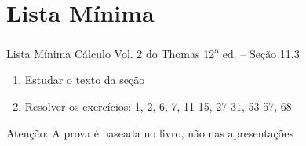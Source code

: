 \section{Lista Mínima}

\begin{frame}{Lista Mínima}
  Cálculo Vol. 2 do Thomas 12\textsuperscript{a} ed. -- Seção 11.3
  \begin{enumerate}
    \item Estudar o texto da seção
    \item Resolver os exercícios: 1, 2, 6, 7, 11-15, 27-31, 53-57, 68
  \end{enumerate}

  \vfill
  Atenção: A prova é baseada no livro, não nas apresentações
\end{frame}


